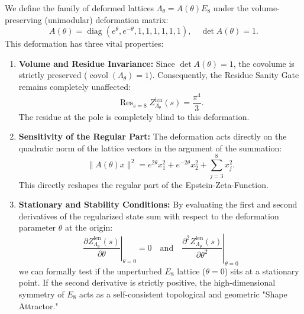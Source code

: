 \documentclass[11pt,a4paper]{article}
\theoremstyle{definition}
\begin{document}
	We define the family of deformed lattices $\Lambda_\theta = A(\theta) E_8$ under the volume-preserving (unimodular) deformation matrix:
	\begin{equation}
		A(\theta) = \operatorname{diag}\left(e^\theta, e^{-\theta}, 1, 1, 1, 1, 1, 1\right), \quad \det A(\theta) = 1.
	\end{equation}
	This deformation has three vital properties:
	\begin{enumerate}
		\item \textbf{Volume and Residue Invariance:} Since $\det A(\theta) = 1$, the covolume is strictly preserved ($\operatorname{covol}(\Lambda_\theta) = 1$). Consequently, the Residue Sanity Gate remains completely unaffected:
		\begin{equation}
			\operatorname{Res}_{s=8} Z_{\Lambda_\theta}^{\mathrm{len}}(s) = \frac{\pi^4}{3}.
		\end{equation}
		The residue at the pole is completely blind to this deformation.
		\item \textbf{Sensitivity of the Regular Part:} The deformation acts directly on the quadratic norm of the lattice vectors in the argument of the summation:
		\begin{equation}
			\|A(\theta)x\|^2 = e^{2\theta}x_1^2 + e^{-2\theta}x_2^2 + \sum_{j=3}^8 x_j^2.
		\end{equation}
		This directly reshapes the regular part of the Epstein-Zeta-Function.
		\item \textbf{Stationary and Stability Conditions:} By evaluating the first and second derivatives of the regularized state sum with respect to the deformation parameter $\theta$ at the origin:
		\begin{equation}
			\left.\frac{\partial Z_{\Lambda_\theta}^{\mathrm{len}}(s)}{\partial \theta}\right|_{\theta=0} = 0 \quad \text{and} \quad \left.\frac{\partial^2 Z_{\Lambda_\theta}^{\mathrm{len}}(s)}{\partial \theta^2}\right|_{\theta=0}
		\end{equation}
		we can formally test if the unperturbed $E_8$ lattice ($\theta = 0$) sits at a stationary point. If the second derivative is strictly positive, the high-dimensional symmetry of $E_8$ acts as a self-consistent topological and geometric "Shape Attractor."
	\end{enumerate}
	
\end{document}
